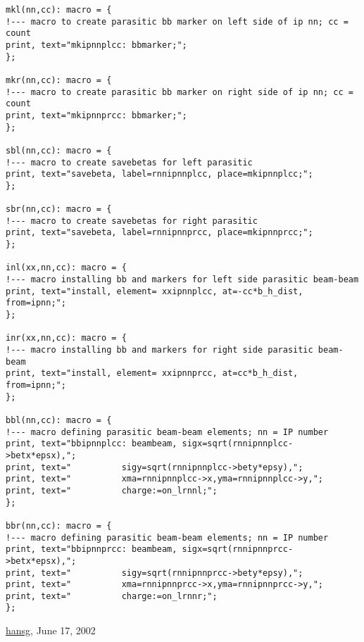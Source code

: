 \begin{verbatim}
mkl(nn,cc): macro = {
!--- macro to create parasitic bb marker on left side of ip nn; cc = count
print, text="mkipnnplcc: bbmarker;";
};

mkr(nn,cc): macro = {
!--- macro to create parasitic bb marker on right side of ip nn; cc = count
print, text="mkipnnprcc: bbmarker;";
};

sbl(nn,cc): macro = {
!--- macro to create savebetas for left parasitic
print, text="savebeta, label=rnnipnnplcc, place=mkipnnplcc;";
};

sbr(nn,cc): macro = {
!--- macro to create savebetas for right parasitic
print, text="savebeta, label=rnnipnnprcc, place=mkipnnprcc;";
};

inl(xx,nn,cc): macro = {
!--- macro installing bb and markers for left side parasitic beam-beam
print, text="install, element= xxipnnplcc, at=-cc*b_h_dist, from=ipnn;";
};

inr(xx,nn,cc): macro = {
!--- macro installing bb and markers for right side parasitic beam-beam
print, text="install, element= xxipnnprcc, at=cc*b_h_dist, from=ipnn;";
};

bbl(nn,cc): macro = {
!--- macro defining parasitic beam-beam elements; nn = IP number
print, text="bbipnnplcc: beambeam, sigx=sqrt(rnnipnnplcc->betx*epsx),";
print, text="          sigy=sqrt(rnnipnnplcc->bety*epsy),";
print, text="          xma=rnnipnnplcc->x,yma=rnnipnnplcc->y,";
print, text="          charge:=on_lrnnl;";
};

bbr(nn,cc): macro = {
!--- macro defining parasitic beam-beam elements; nn = IP number
print, text="bbipnnprcc: beambeam, sigx=sqrt(rnnipnnprcc->betx*epsx),";
print, text="          sigy=sqrt(rnnipnnprcc->bety*epsy),";
print, text="          xma=rnnipnnprcc->x,yma=rnnipnnprcc->y,";
print, text="          charge:=on_lrnnr;";
};
\end{verbatim}\href{http://www.cern.ch/Hans.Grote/hansg_sign.html}{hansg}, June 17, 2002 

